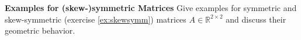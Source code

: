 \textbf{Examples for (skew-)symmetric Matrices}
Give examples for symmetric and skew-symmetric (exercise \ref{ex:skewsymm}) matrices $A \in \mathbb{R}^{2 \times 2}$ and discuss their geometric behavior.